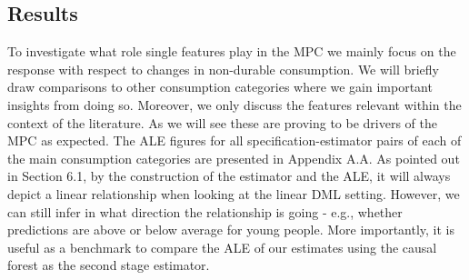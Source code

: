 \subsection{Results} 
To investigate what role single features play in the MPC we mainly focus on the response with respect to changes in non-durable consumption. We will briefly draw comparisons to other consumption categories where we gain important insights from doing so. Moreover, we only discuss the features relevant within the context of the literature. As we will see these are proving to be drivers of the MPC as expected. The ALE figures for all specification-estimator pairs of each of the main consumption categories are presented in Appendix A.A. As pointed out in Section 6.1, by the construction of the estimator and the ALE, it will always depict a linear relationship when looking at the linear DML setting. However, we can still infer in what direction the relationship is going - e.g., whether predictions are above or below average for young people. More importantly, it is useful as a benchmark to compare the ALE of our estimates using the causal forest as the second stage estimator. \\
